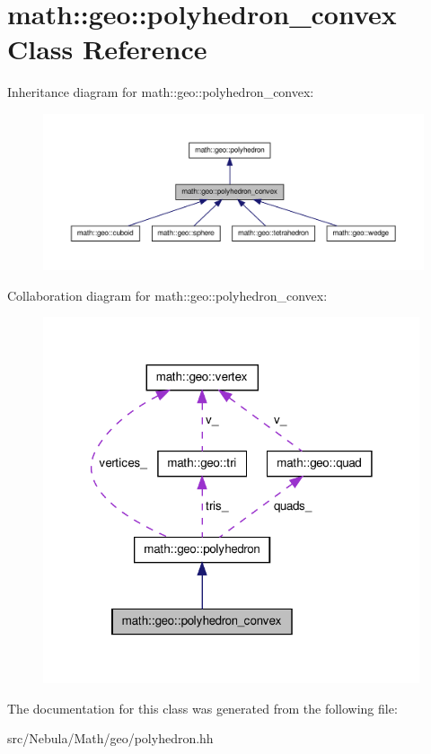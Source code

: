 \hypertarget{classmath_1_1geo_1_1polyhedron__convex}{\section{math\-:\-:geo\-:\-:polyhedron\-\_\-convex \-Class \-Reference}
\label{classmath_1_1geo_1_1polyhedron__convex}
}


\-Inheritance diagram for math\-:\-:geo\-:\-:polyhedron\-\_\-convex\-:\nopagebreak
\begin{figure}[H]
\begin{center}
\leavevmode
\includegraphics[width=350pt]{classmath_1_1geo_1_1polyhedron__convex__inherit__graph}
\end{center}
\end{figure}


\-Collaboration diagram for math\-:\-:geo\-:\-:polyhedron\-\_\-convex\-:\nopagebreak
\begin{figure}[H]
\begin{center}
\leavevmode
\includegraphics[width=314pt]{classmath_1_1geo_1_1polyhedron__convex__coll__graph}
\end{center}
\end{figure}


\-The documentation for this class was generated from the following file\-:\begin{DoxyCompactItemize}
\item 
src/\-Nebula/\-Math/geo/polyhedron.\-hh\end{DoxyCompactItemize}
